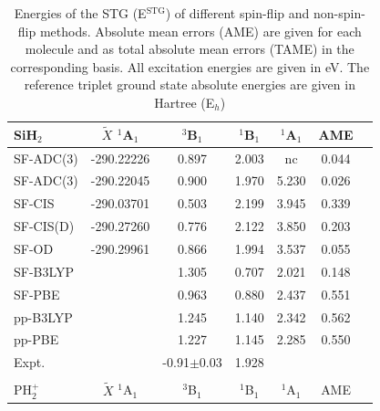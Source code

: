 \documentclass[aip,graphicx,amsmath,reprint]{revtex4-1}
\begin{document}
\begin{table}
\begin{ruledtabular}
\begin{tabular}{lcccccc}
\end{tabular}
\end{ruledtabular}
\end{table}

\begin{table}
\caption{\label{tab:carbene2} Energies of the STG (E$^{{\text{STG}}}$) of different spin-flip and non-spin-flip methods. Absolute mean errors (AME) are given for each molecule and as total absolute mean errors (TAME) in the corresponding basis. All excitation energies are given in eV. The reference triplet ground state absolute energies are given in Hartree (E$_h$)}
\begin{ruledtabular}
\begin{tabular}{lcccccc}
SiH$_2$&${\tilde{X}}$ $^1$A$_1$&$^3$B$_1$&$^1$B$_1$&$^1$A$_1$&AME\\
\hline
SF-ADC(3)\footnotemark[1]&-290.22226&0.897&2.003&nc&0.044\\
SF-ADC(3)\footnotemark[2]&-290.22045&0.900&1.970&5.230&0.026\\
SF-CIS\footnotemark[3]&-290.03701&0.503&2.199&3.945&0.339\\
SF-CIS(D)\footnotemark[3]&-290.27260&0.776&2.122&3.850&0.203\\
SF-OD\footnotemark[3]&-290.29961&0.866&1.994&3.537&0.055\\
SF-B3LYP\footnotemark[4]&&1.305&0.707&2.021&0.148\\
SF-PBE\footnotemark[4]&&0.963&0.880&2.437&0.551\\
pp-B3LYP\footnotemark[5]&&1.245&1.140&2.342&0.562\\
pp-PBE\footnotemark[5]&&1.227&1.145&2.285&0.550\\
Expt.&&-0.91$\pm$0.03\footnotemark[6]&1.928\footnotemark[7]&&&\\
&&&&&\\
PH$_2^+$&${\tilde{X}}$ $^1$A$_1$&$^3$B$_1$&$^1$B$_1$&$^1$A$_1$&AME\\

\end{tabular}
\end{ruledtabular}
\end{table}
\end{document}
